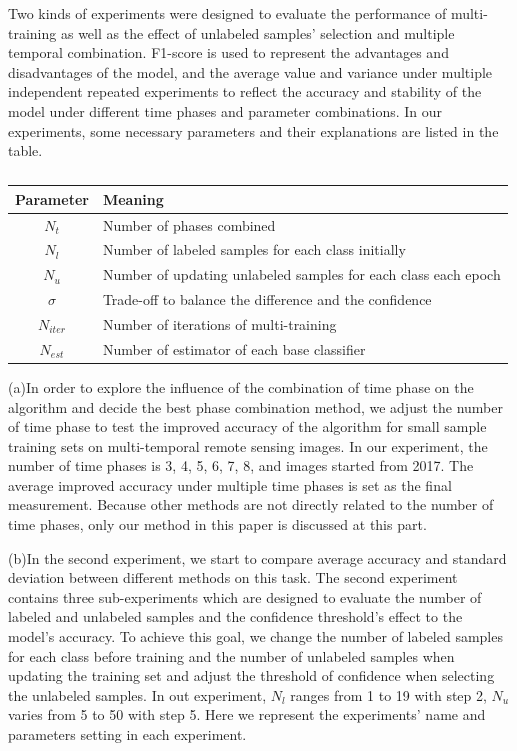\documentclass{isprs} %
\begin{document}
Two kinds of experiments were designed to evaluate the performance of multi-training as well as the effect of unlabeled samples’ selection and multiple temporal combination. F1-score is used to represent the advantages and disadvantages of the model, and the average value and variance under multiple independent repeated experiments to reflect the accuracy and stability of the model under different time phases and parameter combinations. In our experiments, some necessary parameters and their explanations are listed in the table.

\begin{table}[ht!]
	\begin{center}
		\begin{tabular}{c|p{}}
		\toprule
		Parameter & Meaning  \\
		\midrule
		$N_t$ & Number of phases combined\\
		$N_l$ & Number of labeled samples for each class initially\\
		$N_u$ & Number of updating unlabeled samples for each class each epoch\\
		$\sigma$ & Trade-off to balance the difference and the confidence\\
		$N_{iter}$ & Number of iterations of multi-training\\
		$N_{est}$ & Number of estimator of each base classifier\\
		\bottomrule
		\end{tabular}
	\caption{}
	\end{center}
\end{table}

(a)In order to explore the influence of the combination of time phase on the algorithm and decide the best phase combination method, we adjust the number of time phase to test the improved accuracy of the algorithm for small sample training sets on multi-temporal remote sensing images. In our experiment, the number of time phases is {3, 4, 5, 6, 7, 8}, and images started from 2017. The average improved accuracy under multiple time phases is set as the final measurement. Because other methods are not directly related to the number of time phases, only our method in this paper is discussed at this part.

(b)In the second experiment, we start to compare average accuracy and standard deviation between different methods on this task. The second experiment contains three sub-experiments which are designed to evaluate the number of labeled and unlabeled samples and the confidence threshold’s effect to the model’s accuracy. To achieve this goal, we change the number of labeled samples for each class before training and the number of unlabeled samples when updating the training set and adjust the threshold of confidence when selecting the unlabeled samples. In out experiment, $N_l$ ranges from 1 to 19 with step 2, $N_u$ varies from 5 to 50 with step 5. 
Here we represent the experiments’ name and parameters setting in each experiment.
\end{document}
